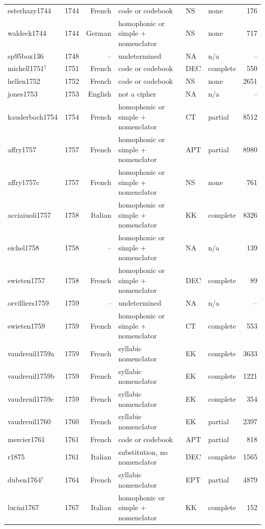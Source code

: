 {\begin{longtable}{@{}llrlllr@{}}
esterhazy1744 & 1744 & French & code or codebook & NS & none & 176 \\
waldeck1744 & 1744 & German & homophonic or simple + nomenclator & NS & none & 717 \\
sp95box136 & 1748 & -- & undetermined & NA & n/a & -- \\
michell1751$^\dagger$ & 1751 & French & code or codebook & DEC & complete & 550 \\
hellen1752 & 1752 & French & code or codebook & NS & none & 2651 \\
jones1753 & 1753 & English & not a cipher & NA & n/a & -- \\
kauderbach1754 & 1754 & French & homophonic or simple + nomenclator & CT & partial & 8512 \\
affry1757 & 1757 & French & homophonic or simple + nomenclator & APT & partial & 8980 \\
affry1757c & 1757 & French & homophonic or simple + nomenclator & NS & none & 761 \\
acciaiuoli1757 & 1758 & Italian & homophonic or simple + nomenclator & KK & complete & 8326 \\
eichel1758 & 1758 & -- & homophonic or simple + nomenclator & NA & n/a & 139 \\
swieten1757 & 1758 & French & homophonic or simple + nomenclator & DEC & complete & 89 \\
orvilliers1759 & 1759 & -- & undetermined & NA & n/a & -- \\
swieten1759 & 1759 & French & homophonic or simple + nomenclator & CT & complete & 553 \\
vaudreuil1759a & 1759 & French & syllabic nomenclator & EK & complete & 3633 \\
vaudreuil1759b & 1759 & French & syllabic nomenclator & EK & complete & 1221 \\
vaudreuil1759c & 1759 & French & syllabic nomenclator & EK & complete & 354 \\
vaudreuil1760 & 1760 & French & syllabic nomenclator & EK & partial & 2397 \\
mercier1761 & 1761 & French & code or codebook & APT & partial & 818 \\
r1875 & 1761 & Italian & substitution, no nomenclator & DEC & complete & 1565 \\
duben1764$^\dagger$ & 1764 & French & syllabic nomenclator & EPT & partial & 4879 \\
lucini1767 & 1767 & Italian & homophonic or simple + nomenclator & KK & complete & 152 \\

\end{longtable}}
